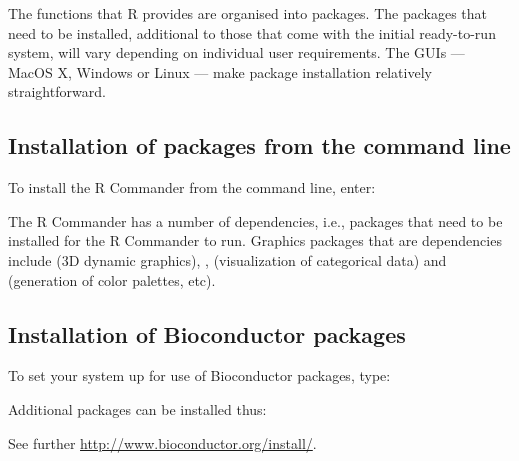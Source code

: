 The functions that R provides are organised into packages.  The
packages that need to be installed, additional to those that come with
the initial ready-to-run system, will vary depending on individual
user requirements.  The GUIs --- MacOS X, Windows or Linux --- make
package installation relatively straightforward.

\subsection*{Installation of packages from the command line}

To install the R Commander from the command line, enter:
\begin{knitrout}
\color{fgcolor}\begin{kframe}
\begin{alltt}
\hlstd{(}\hlstd{,} \hlstd{=}\hlstd{)}
\end{alltt}
\end{kframe}
\end{knitrout}
The R Commander has a number of dependencies, i.e., packages that
need to be installed for the R Commander to run.  Graphics packages
that are dependencies include  (3D dynamic graphics),
,  (visualization of categorical
data) and  (generation of color palettes, etc).

\subsection*{Installation of Bioconductor packages}
  To set your system up for use of
Bioconductor packages, type:
\begin{knitrout}
\color{fgcolor}\begin{kframe}
\begin{alltt}
\hlstd{(}\hlstd{)}
\hlstd{()}
\end{alltt}
\end{kframe}
\end{knitrout}
Additional packages can be installed thus:
\begin{knitrout}
\color{fgcolor}\begin{kframe}
\begin{alltt}
\hlstd{(}\hlstd{(}\hlstd{,} \hlstd{))}
\end{alltt}
\end{kframe}
\end{knitrout}
See further \url{http://www.bioconductor.org/install/}.

